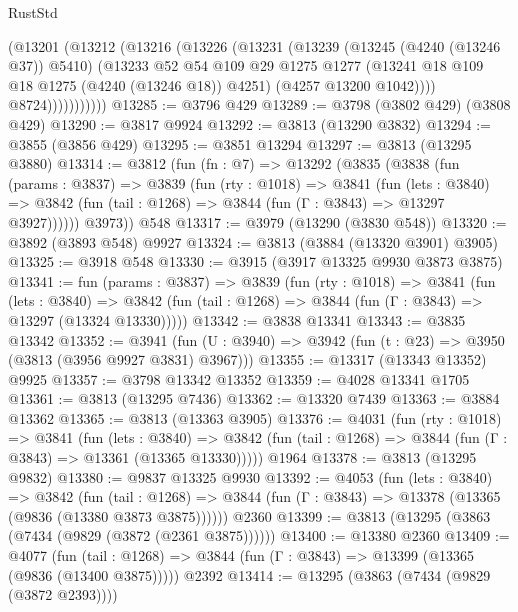 \begin{lexlean}{RustStd}
\begin{coremodule}
{\begin{coremodule}
{{{{{{{{{{{{{{{{{{{{{{{{{{{{{{{{{{{                  (@13201
                    (@13212
                      (@13216
                        (@13226
                          (@13231
                            (@13239
                              (@13245 (@4240 (@13246 @37)) @5410)
                              (@13233
                                @52
                                @54
                                @109
                                @29
                                @1275
                                @1277
                                (@13241 @18 @109 @18 @1275 (@4240 (@13246 @18)) @4251)
                                (@4257 @13200 @1042))))
                          @8724)))))))))))
@13285 := @3796 @429
@13289 := @3798 (@3802 @429) (@3808 @429)
@13290 := @3817 @9924
@13292 := @3813 (@13290 @3832)
@13294 := @3855 (@3856 @429)
@13295 := @3851 @13294
@13297 := @3813 (@13295 @3880)
@13314 := @3812
    (fun (fn : @7) =>
    @13292
      (@3835
        (@3838
          (fun (params : @3837) =>
          @3839
            (fun (rty : @1018) =>
            @3841
              (fun (lets : @3840) =>
              @3842 (fun (tail : @1268) => @3844 (fun (Γ : @3843) => @13297 @3927))))))
        @3973))
    @548
@13317 := @3979 (@13290 (@3830 @548))
@13320 := @3892 (@3893 @548) @9927
@13324 := @3813 (@3884 (@13320 @3901) @3905)
@13325 := @3918 @548
@13330 := @3915 (@3917 @13325 @9930 @3873 @3875)
@13341 := fun (params : @3837) =>
  @3839
    (fun (rty : @1018) =>
    @3841
      (fun (lets : @3840) =>
      @3842 (fun (tail : @1268) => @3844 (fun (Γ : @3843) => @13297 (@13324 @13330)))))
@13342 := @3838 @13341
@13343 := @3835 @13342
@13352 := @3941
    (fun (U : @3940) => @3942 (fun (t : @23) => @3950 (@3813 (@3956 @9927 @3831) @3967)))
@13355 := @13317 (@13343 @13352) @9925
@13357 := @3798 @13342 @13352
@13359 := @4028 @13341 @1705
@13361 := @3813 (@13295 @7436)
@13362 := @13320 @7439
@13363 := @3884 @13362
@13365 := @3813 (@13363 @3905)
@13376 := @4031
    (fun (rty : @1018) =>
    @3841
      (fun (lets : @3840) =>
      @3842 (fun (tail : @1268) => @3844 (fun (Γ : @3843) => @13361 (@13365 @13330)))))
    @1964
@13378 := @3813 (@13295 @9832)
@13380 := @9837 @13325 @9930
@13392 := @4053
    (fun (lets : @3840) =>
    @3842
      (fun (tail : @1268) =>
      @3844 (fun (Γ : @3843) => @13378 (@13365 (@9836 (@13380 @3873 @3875))))))
    @2360
@13399 := @3813 (@13295 (@3863 (@7434 (@9829 (@3872 (@2361 @3875))))))
@13400 := @13380 @2360
@13409 := @4077
    (fun (tail : @1268) => @3844 (fun (Γ : @3843) => @13399 (@13365 (@9836 (@13400 @3875)))))
    @2392
@13414 := @13295 (@3863 (@7434 (@9829 (@3872 @2393))))
}}}}}}}}}}}}}}}}}}}}}}}}}}}}}}}}}}}
\end{coremodule}}
\end{coremodule}
\end{lexlean}
